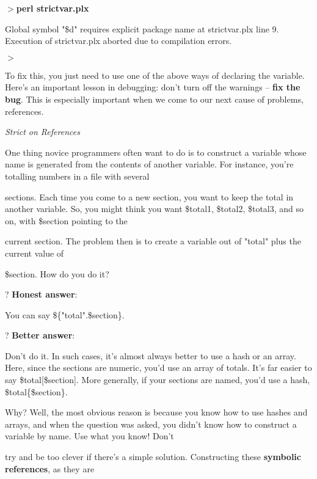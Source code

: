 \documentclass[a4paper,11pt]{book}
\begin{document}
\noindent $>$\textbf{perl strictvar.plx}

\noindent Global symbol "\$d" requires explicit package name at strictvar.plx line 9. Execution of strictvar.plx aborted due to compilation errors.

\noindent $>$

\noindent 

\noindent To fix this, you just need to use one of the above ways of declaring the variable. Here's an important lesson in debugging: don't turn off the warnings -- \textbf{fix the bug}. This is especially important when we come to our next cause of problems, references.

\noindent 

\noindent \textit{Strict on References}

\noindent One thing novice programmers often want to do is to construct a variable whose name is generated from the contents of another variable. For instance, you're totalling numbers in a file with several

\noindent sections. Each time you come to a new section, you want to keep the total in another variable. So, you might think you want \$total1, \$total2, \$total3, and so on, with \$section pointing to the

\noindent current section. The problem then is to create a variable out of "total" plus the current value of

\noindent \$section. How do you do it?

\noindent 

\noindent ? \textbf{Honest answer}:

\noindent You can say \$\{"total".\$section\}.

\noindent ? \textbf{Better answer}:

\noindent Don't do it. In such cases, it's almost always better to use a hash or an array. Here, since the sections are numeric, you'd use an array of totals. It's far easier to say \$total[\$section]. More generally, if your sections are named, you'd use a hash, \$total\{\$section\}.

\noindent 

\noindent Why? Well, the most obvious reason is because you know how to use hashes and arrays, and when the question was asked, you didn't know how to construct a variable by name. Use what you know! Don't

\noindent try and be too clever if there's a simple solution. Constructing these \textbf{symbolic references}, as they are
\end{document}
